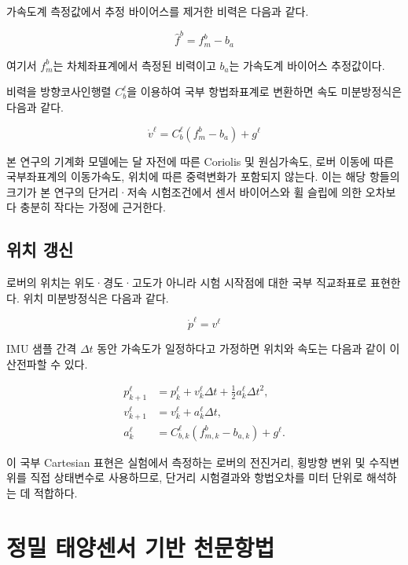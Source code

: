 \documentclass[]{IAC_style}
\begin{document}
가속도계 측정값에서 추정 바이어스를 제거한 비력은 다음과 같다.

\begin{equation*}
\hat f^b=f_m^b-b_a
\end{equation*}

여기서 $f_m^b$는 차체좌표계에서 측정된 비력이고 $b_a$는 가속도계 바이어스 추정값이다.

비력을 방향코사인행렬 $C_b^\ell$을 이용하여 국부 항법좌표계로 변환하면 속도 미분방정식은 다음과 같다.

\begin{equation}
\tag{4}\label{eq:4}
\dot v^\ell=C_b^\ell\left(f_m^b-b_a\right)+g^\ell
\end{equation}

본 연구의 기계화 모델에는 달 자전에 따른 Coriolis 및 원심가속도, 로버 이동에 따른 국부좌표계의 이동가속도, 위치에 따른 중력변화가 포함되지 않는다. 이는 해당 항들의 크기가 본 연구의 단거리·저속 시험조건에서 센서 바이어스와 휠 슬립에 의한 오차보다 충분히 작다는 가정에 근거한다.

\subsection{위치 갱신}

로버의 위치는 위도·경도·고도가 아니라 시험 시작점에 대한 국부 직교좌표로 표현한다. 위치 미분방정식은 다음과 같다.

\begin{equation}
\tag{5}\label{eq:5}
\dot p^\ell=v^\ell
\end{equation}

IMU 샘플 간격 $\Delta t$ 동안 가속도가 일정하다고 가정하면 위치와 속도는 다음과 같이 이산전파할 수 있다.

\begin{equation}
\tag{6}\label{eq:6}
\begin{aligned}
p_{k+1}^\ell
  &=p_k^\ell+v_k^\ell\Delta t
    +\tfrac{1}{2}a_k^\ell\Delta t^2,\\
v_{k+1}^\ell
  &=v_k^\ell+a_k^\ell\Delta t,\\
a_k^\ell
  &=C_{b,k}^\ell(f_{m,k}^b-b_{a,k})+g^\ell.
\end{aligned}
\end{equation}

이 국부 Cartesian 표현은 실험에서 측정하는 로버의 전진거리, 횡방향 변위 및 수직변위를 직접 상태변수로 사용하므로, 단거리 시험결과와 항법오차를 미터 단위로 해석하는 데 적합하다.

\section{정밀 태양센서 기반 천문항법}
\end{document}
